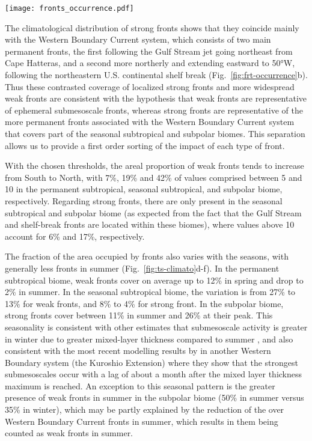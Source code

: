 \begin{figure*}
  \texttt{[image: fronts\_occurrence.pdf]}
  \caption{
    occurrence of (a) weak fronts and (b) strong fronts expressed as the percentage of time over the entire time series (2000--2020) that a given pixel is occupied by a front.
  }%
  \label{fig:frt-occurrence}
\end{figure*}

The climatological distribution of strong fronts shows that they coincide mainly with the Western Boundary Current system, which consists of two main permanent fronts, the first following the Gulf Stream jet going northeast from Cape Hatteras, and a second more northerly and extending eastward to 50°W, following the northeastern U.S.
continental shelf break (Fig.~\ref{fig:frt-occurrence}b).
Thus these contrasted coverage of localized strong fronts and more widespread weak fronts are consistent with the hypothesis that weak fronts are representative of ephemeral submesoscale fronts, whereas strong fronts are representative of the more permanent fronts associated with the Western Boundary Current system that covers part of the seasonal subtropical and subpolar biomes.
This separation allows us to provide a first order sorting of the impact of each type of front.

With the chosen thresholds, the areal proportion of weak fronts tends to increase from South to North, with 7\%, 19\% and 42\% of  values comprised between 5 and 10 in the permanent subtropical, seasonal subtropical, and subpolar biome, respectively.
Regarding strong fronts, there are only present in the seasonal subtropical and subpolar biome (as expected from the fact that the Gulf Stream and shelf-break fronts are located within these biomes), where  values above 10 account for 6\% and 17\%, respectively.

The fraction of the area occupied by fronts also varies with the seasons, with generally less fronts in summer (Fig.~\ref{fig:ts-climato}d-f).
In the permanent subtropical biome, weak fronts cover on average up to 12\% in spring and drop to 2\% in summer.
In the seasonal subtropical biome, the variation is from 27\% to 13\% for weak fronts, and 8\% to 4\% for strong front.
In the subpolar biome, strong fronts cover between 11\% in summer and 26\% at their peak.
This seasonality is consistent with other estimates that submesoscale activity is greater in winter due to greater mixed-layer thickness compared to summer \parencite{callies_2015}, and also consistent with the most recent modelling results by \textcite{dong_2020} in another Western Boundary system (the Kuroshio Extension) where they show that the strongest submesoscales occur with a lag of about a month after the mixed layer thickness maximum is reached.
An exception to this seasonal pattern is the greater presence of weak fronts in summer in the subpolar biome (50\% in summer versus 35\% in winter), which may be partly explained by the reduction of the  over Western Boundary Current fronts in summer, which results in them being counted as weak fronts in summer.

